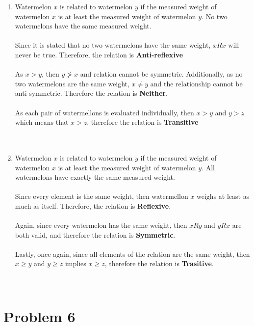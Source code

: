 \documentclass{amsart}
\theoremstyle{definition}
\theoremstyle{Exercise}
\theoremstyle{remark}
\theoremstyle{rule}
\numberwithin{equation}{section}
\begin{document}
\begin{enumerate}[label=(\alph*)]
\item Watermelon $x$ is related to watermelon $y$ if the measured weight of watermelon $x$ is at least the measured weight of watermelon $y$. No two watermelons have the same measured weight.\\\\
Since it is stated that no two watermelons have the same weight, $xRx$ will never be true. Therefore, the relation is \textbf{Anti-reflexive}\\\\
As $x>y$, then $y\not>x$ and relation cannot be symmetric. Additionally, as no two watermelons are the same weight, $x\neq y$ and the relationship cannot be anti-symmetric. Therefore the relation is \textbf{Neither}.\\\\
As each pair of watermellons is evaluated individually, then $x>y$ and $y>z$ which means that $x>z$, therefore the relation is \textbf{Transitive}\\ 
\\\\
\item Watermelon $x$ is related to watermelon $y$ if the measured weight of watermelon $x$ is at least the measured weight of watermelon $y$. All watermelons have exactly the same measured weight.\\\\
Since every element is the same weight, then watermellon $x$ weighs at least as much as itself. Therefore, the relation is \textbf{Reflexive}.\\\\
Again, since every watermelon has the same weight, then $xRy$ and $yRx$ are both valid, and therefore the relation is \textbf{Symmetric}.\\\\
Lastly, once again, since all elements of the relation are the same weight, then $x\geq y$ and $y\geq z$ implies $x\geq z$, therefore the relation is \textbf{Trasitive}.\\
\\\\
\end{enumerate}
 \newpage
\vspace*{0,25in}
\section*{Problem 6}
\end{document}
